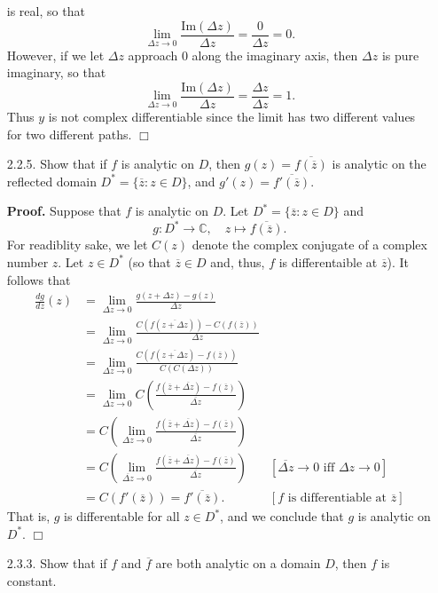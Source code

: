 \documentclass[9pt]{article}
\newcommand{\qed}{\hfill \ensuremath{\Box}}
\newcommand{\C}{\mathbb{C}}
\begin{document}
\begin{enumerate}
      is real, so that 
      $$\lim_{\Delta z\rightarrow 0}\frac{\text{Im}(\Delta z)}{\Delta z}
        = \frac{0}{\Delta z} = 0.$$     
      However, if we let $\Delta z$ approach 0 along the imaginary axis, then
      $\Delta z$ is pure imaginary, so that 
      $$\lim_{\Delta z\rightarrow 0}\frac{\text{Im}(\Delta z)}{\Delta z}
        = \frac{\Delta z}{\Delta z} = 1.$$
      Thus $y$ is not complex differentiable since the limit has two different
      values for two different paths. \qed
   \item[2.2.5.]  Show that if $f$ is analytic on $D$, then
                  $g(z) = \overline{f(\overline{z})}$ is analytic on the
                  reflected domain $D^* = \{\overline{z} : z \in D\}$, and
                  $g'(z) = \overline{f'(\overline{z})}$.
                  
      \textbf{Proof.} Suppose that $f$ is analytic on $D$. Let
      $D^* = \{\overline{z} : z \in D\}$ and
      $$g : D^* \rightarrow \C, \quad z \mapsto\overline{f(\overline{z})}.$$
      For readiblity sake, we let $C(z)$ denote the complex conjugate of a
      complex number $z$. Let $z \in D^*$ (so that $\overline{z} \in D$ and,
      thus, $f$ is differentaible at $\overline{z}$). It follows that
      \begin{align*}
         \frac{dg}{dz}(z) &= \lim_{\Delta z \rightarrow 0}
            \frac{g(z + \Delta z) - g(z)}{\Delta z} \\
            &= \lim_{\Delta z \rightarrow 0}
            \frac{C(f(\overline{z + \Delta z})) -
               C(f(\overline{z}))}{\Delta z} \\
            &= \lim_{\Delta z \rightarrow 0}
            \frac{C(f(\overline{z + \Delta z}) -
               f(\overline{z}))}{C(C(\Delta z))} \\
            &= \lim_{\Delta z \rightarrow 0}
            C\left(\frac{f(\overline{z} + \overline{\Delta z}) -
               f(\overline{z})}{\overline{\Delta z}}\right) \\
            &= C\left(\lim_{\Delta z \rightarrow 0}
            \frac{f(\overline{z} + \overline{\Delta z}) -
               f(\overline{z})}{\overline{\Delta z}}\right) \\
            &= C\left(\lim_{\overline{\Delta z} \rightarrow 0}
            \frac{f(\overline{z} + \overline{\Delta z}) -
               f(\overline{z})}{\overline{\Delta z}}\right)
               &[\overline{\Delta z} \rightarrow 0 \text{ iff }
                 \Delta z \rightarrow 0] \\
            &= C(f'(\overline{z})) = \overline{f'(\overline{z})}.
               &[f \text{ is differentiable at }\overline{z}]
      \end{align*}
      That is, $g$ is differentable for all $z \in D^*$, and we conclude that
      $g$ is analytic on $D^*$. \qed
   \item[2.3.3.]  Show that if $f$ and $\overline{f}$ are both analytic on a
                  domain $D$, then $f$ is constant.
                  

\end{enumerate}
\end{document}
